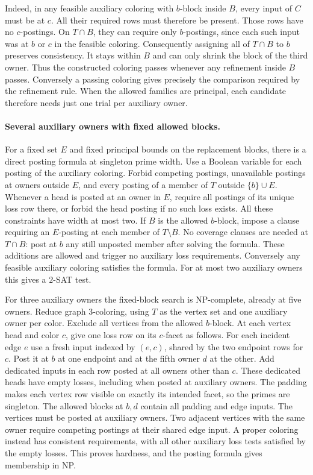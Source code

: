 Indeed, in any feasible auxiliary coloring with
$b$-block inside $B$, every input of $C$ must be
at $c$. All their required rows must therefore be
present. Those rows have no $c$-postings. On $T\cap B$,
they can require only $b$-postings, since each such
input was at $b$ or $c$ in the feasible coloring.
Consequently assigning all of $T\cap B$ to $b$
preserves consistency. It stays within $B$ and
can only shrink the block of the third owner.
Thus the constructed coloring passes whenever any
refinement inside $B$ passes. Conversely a passing
coloring gives precisely the comparison required
by the refinement rule. When the allowed families
are principal, each candidate therefore needs just
one trial per auxiliary owner.

\paragraph{Several auxiliary owners with fixed allowed blocks.}
For a fixed set $E$ and fixed principal bounds on the
replacement blocks, there is a direct posting formula
at singleton prime width. Use a Boolean variable for
each posting of the auxiliary coloring. Forbid competing
postings, unavailable postings at owners outside $E$,
and every posting of a member of $T$ outside
$\{b\}\cup E$. Whenever a head is posted at an owner
in $E$, require all postings of its unique loss row
there, or forbid the head posting if no such loss exists.
All these constraints have width at most two.
If $B$ is the allowed $b$-block, impose a clause
requiring an $E$-posting at each member of $T\setminus B$.
No coverage clauses are needed at $T\cap B$: post at
$b$ any still unposted member after solving the formula.
These additions are allowed and trigger no auxiliary
loss requirements. Conversely any feasible auxiliary
coloring satisfies the formula. For at most two
auxiliary owners this gives a $2$-SAT test.

For three auxiliary owners the fixed-block search
is NP-complete, already at five owners. Reduce graph
$3$-coloring, using $T$ as the vertex set and one
auxiliary owner per color. Exclude all vertices from
the allowed $b$-block. At each vertex head and color
$c$, give one loss row on its $c$-facet as follows.
For each incident edge $e$ use a fresh input indexed
by $(e,c)$, shared by the two endpoint rows for $c$.
Post it at $b$ at one endpoint and at the fifth owner
$d$ at the other. Add dedicated inputs in each row
posted at all owners other than $c$. These dedicated
heads have empty losses, including when posted at
auxiliary owners. The padding makes each vertex row
visible on exactly its intended facet, so the primes
are singleton. The allowed blocks at $b,d$ contain
all padding and edge inputs. The vertices must be
posted at auxiliary owners. Two adjacent vertices
with the same owner require competing postings at
their shared edge input. A proper coloring instead
has consistent requirements, with all other auxiliary
loss tests satisfied by the empty losses. This proves
hardness, and the posting formula gives membership
in NP.

